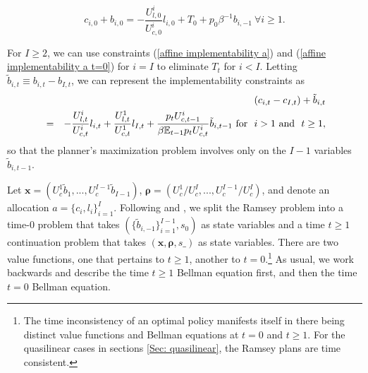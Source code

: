 \documentclass[thmsb,11pt]{article}
\begin{document}
\begin{equation}
\label{affine implementability a t=0}
c_{i,0}+b_{i,0}=-\frac{U_{l,0}^{i}}{U_{c,0}^{i}}l_{i,0}+T_{0}+
p_0 \beta^{-1}b_{i,-1}\ \forall i \geq 1.
\end{equation}

\noindent For $I\geq 2$, we can use constraints (\ref{affine implementability
a}) and (\ref{affine implementability
a t=0}) for  $i=I$ to eliminate $T_{t}$ for $i < I$. Letting $\tilde{b}%
_{i,t}\equiv b_{i,t}-b_{I,t}$, we can represent the implementability constraints
as
\begin{eqnarray}
\label{affine implementability b}
&&\left( c_{i,t}-c_{I,t}\right) +\tilde{b}_{i,t}\\
&=&-\frac{U_{l,t}^{i}}{U_{c,t}^{i}}l_{i,t}+\frac{U^1_{l,t}}{U^1_{c,t}}l_{I,t} +\frac{p_tU_{c,t-1}^{i}}{\beta \mathbb{E}%
_{t-1}p_tU_{c,t}^{i}}\tilde{b}_{i,t-1}\ \text{\rm for \ }i>1 \ \text{\rm and \ } t\geq 1,  \notag
\end{eqnarray}
so that  the planner's
maximization problem involves only on the $I-1$ variables $\tilde{b}_{i,t-1}.$


Let $\bm{x}= \left( U_{c}^{1}\tilde{b}_{1},...,U_{c}^{I-1}\tilde{b}_{I-1}\right)$, $\bm{\rho }=\left( U_{c}^{1}/U_{c}^{I},...,U_{c}^{I-1}/U_{c}^{I}\right) $, and denote an allocation $a=\{c_i,l_i\}^{I}_{i=1}.$
Following \cite{Kydland1980} and \cite{Farhi2010}, we split the Ramsey problem into a time-$0$ problem that takes $(\{\tilde{b}_{i,-1}\}^{I-1}_{i=1}, s_0)$ as state variables
and   a time $t \geq 1$ continuation problem  that takes $(\bm x,\bm \rho,s\_)$ as state variables. There are
two value functions, one that pertains to $t\geq 1$, another to $t=0$.\footnote{The time inconsistency of an optimal policy
manifests itself in there being distinct value functions and Bellman equations at $t =0$ and $t \geq 1$. For the quasilinear cases in sections \ref{Sec: quasilinear}, the Ramsey plans are time consistent.}  As usual, we work backwards and describe the time $t \geq 1$ Bellman equation
first, and then the time $t=0$ Bellman equation.
\end{document}
